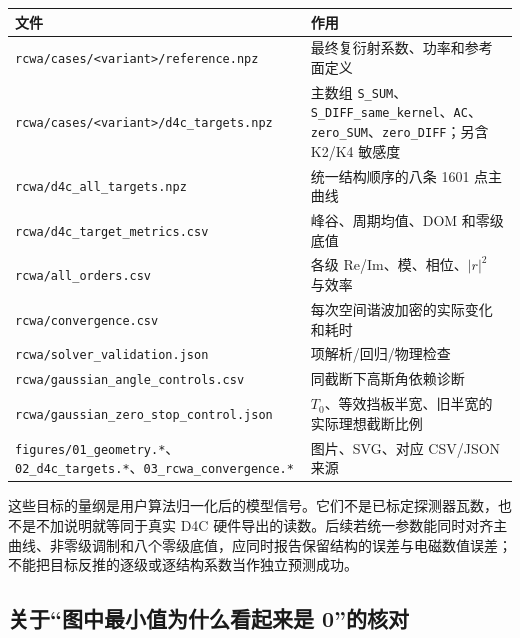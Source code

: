 \documentclass[
  chinese,
  UTF8,
  a4paper,
  11pt]{ctexart}
\newcounter{none} %
\begin{document}
{\def\LTcaptype{none} %
\begin{longtable}[]{@{}
  >{\raggedright\arraybackslash}p{}
  >{\raggedright\arraybackslash}p{}@{}}
\toprule\noalign{}
\begin{minipage}[b]{\linewidth}\raggedright
文件
\end{minipage} & \begin{minipage}[b]{\linewidth}\raggedright
作用
\end{minipage} \\
\midrule\noalign{}
\endhead
\bottomrule\noalign{}
\endlastfoot
\texttt{rcwa/cases/\textless{}variant\textgreater{}/reference.npz} &
最终复衍射系数、功率和参考面定义 \\
\texttt{rcwa/cases/\textless{}variant\textgreater{}/d4c\_targets.npz} &
主数组
\texttt{S\_SUM}、\texttt{S\_DIFF\_same\_kernel}、\texttt{AC}、\texttt{zero\_SUM}、\texttt{zero\_DIFF}；另含
K2/K4 敏感度 \\
\texttt{rcwa/d4c\_all\_targets.npz} & 统一结构顺序的八条 1601
点主曲线 \\
\texttt{rcwa/d4c\_target\_metrics.csv} & 峰谷、周期均值、DOM
和零级底值 \\
\texttt{rcwa/all\_orders.csv} & 各级 Re/Im、模、相位、\(|r|^2\)
与效率 \\
\texttt{rcwa/convergence.csv} & 每次空间谐波加密的实际变化和耗时 \\
\texttt{rcwa/solver\_validation.json} & 32 项解析/回归/物理检查 \\
\texttt{rcwa/gaussian\_angle\_controls.csv} & 同截断下高斯角依赖诊断 \\
\texttt{rcwa/gaussian\_zero\_stop\_control.json} &
\(T_0\)、等效挡板半宽、旧半宽的实际理想截断比例 \\
\texttt{figures/01\_geometry.*}、\texttt{02\_d4c\_targets.*}、\texttt{03\_rcwa\_convergence.*}
& 图片、SVG、对应 CSV/JSON 来源 \\
\end{longtable}
}

这些目标的量纲是用户算法归一化后的模型信号。它们不是已标定探测器瓦数，也不是不加说明就等同于真实
D4C
硬件导出的读数。后续若统一参数能同时对齐主曲线、非零级调制和八个零级底值，应同时报告保留结构的误差与电磁数值误差；不能把目标反推的逐级或逐结构系数当作独立预测成功。

\subsection{关于``图中最小值为什么看起来是
0''的核对}\label{ux5173ux4e8eux56feux4e2dux6700ux5c0fux503cux4e3aux4ec0ux4e48ux770bux8d77ux6765ux662f-0ux7684ux6838ux5bf9}
\end{document}
